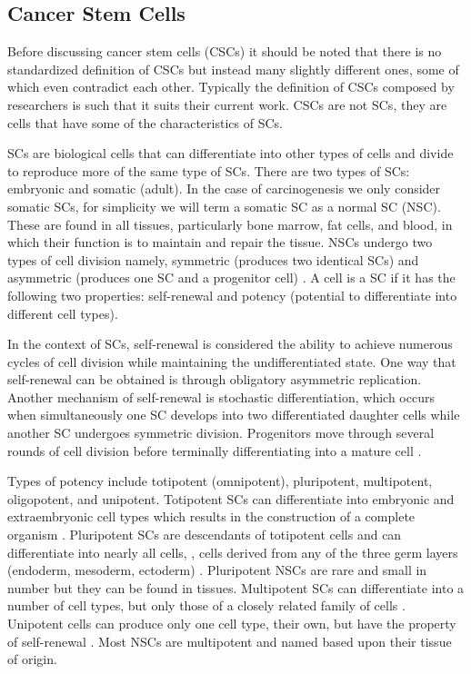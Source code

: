 \documentclass[\main/thesis.tex]{subfiles}
\begin{document}
\subsection{Cancer Stem Cells}

Before discussing cancer stem cells (CSCs) it should be noted that there is no 
standardized definition of CSCs but instead many slightly different ones, some 
of which even contradict each other. Typically the definition of CSCs composed 
by researchers is such that it suits their current work. CSCs are not SCs, they 
are cells that have some of the characteristics of SCs.

SCs are biological cells that can differentiate into other types of cells and 
divide to reproduce more of the same type of SCs. There are two types of SCs: 
embryonic and somatic (adult). In the case of carcinogenesis we only consider 
somatic SCs, for simplicity we will term a somatic SC as a normal SC (NSC). 
These are found in all tissues, particularly bone marrow, fat cells, and 
blood, in which their function is to maintain and repair the tissue. NSCs 
undergo two types of cell division namely, symmetric (produces two identical 
SCs) and asymmetric (produces one SC and a progenitor cell) 
\parencite{Beckmann}. A cell is a SC if it has the following two properties: 
self-renewal and potency (potential to differentiate into different cell types).

In the context of SCs, self-renewal is considered the ability to achieve 
numerous cycles of cell division while maintaining the undifferentiated state. 
One way that self-renewal can be obtained is through obligatory asymmetric 
replication. Another mechanism of self-renewal is stochastic differentiation, 
which occurs when simultaneously one SC develops into two differentiated 
daughter cells while another SC undergoes symmetric division. Progenitors move 
through several rounds of cell division before terminally differentiating into 
a mature cell \parencite{Beckmann}. 

Types of potency include totipotent (omnipotent), pluripotent, multipotent, 
oligopotent, and unipotent. Totipotent SCs can differentiate into embryonic and 
extraembryonic cell types which results in the construction of a complete 
organism \parencite{Scholer}. Pluripotent SCs are descendants of totipotent 
cells and can differentiate into nearly all cells, \ie, cells derived from any 
of the three germ layers (endoderm, mesoderm, ectoderm) \parencite{Scholer}. 
Pluripotent NSCs are rare and small in number but they can be found in tissues. 
Multipotent SCs can differentiate into a number of cell types, but only those 
of a closely related family of cells \parencite{Scholer}. Unipotent cells can 
produce only one cell type, their own, but have the property of self-renewal 
\parencite{Scholer}. Most NSCs are multipotent and named based upon their 
tissue of origin. 
\end{document}
